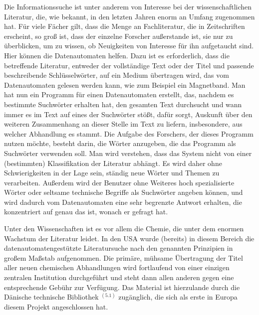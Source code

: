 {Die Informationssuche ist unter anderem von Interesse bei der wissenschaftlichen Literatur, die, wie bekannt, in den letzten Jahren enorm an Umfang zugenommen hat. Für viele Fächer gilt, dass die Menge an Fachliteratur, die in Zeitschriften erscheint, so groß ist, dass der einzelne Forscher außerstande ist, sie nur zu überblicken, um zu wissen, ob Neuigkeiten von Interesse für ihn aufgetaucht sind. Hier können die Datenautomaten helfen. Dazu ist es erforderlich, dass die betreffende Literatur, entweder der vollständige Text oder der Titel und passende beschreibende Schlüsselwörter, auf ein Medium übertragen wird, das vom Datenautomaten gelesen werden kann, wie zum Beispiel ein Magnetband. Man hat nun ein Programm für einen Datenautomaten erstellt, das, nachdem es bestimmte Suchwörter erhalten hat, den gesamten Text durchsucht und wann immer es im Text auf eines der Suchwörter stößt, dafür sorgt, Auskunft über den weiteren Zusammenhang an dieser Stelle im Text zu liefern, insbesondere, aus welcher Abhandlung es stammt. Die Aufgabe des Forschers, der dieses Programm nutzen möchte, besteht darin, die Wörter anzugeben, die das Programm als Suchwörter verwenden soll. Man wird verstehen, dass das System nicht von einer (bestimmten) Klassifikation der Literatur abhängt. Es wird daher ohne Schwierigkeiten in der Lage sein, ständig neue Wörter und Themen zu verarbeiten. Außerdem wird der Benutzer ohne Weiteres hoch spezialisierte Wörter oder seltsame technische Begriffe als Suchwörter angeben können, und wird dadurch vom Datenautomaten eine sehr begrenzte Antwort erhalten, die konzentriert auf genau das ist, wonach er gefragt hat.

Unter den Wissenschaften ist es vor allem die Chemie, die unter dem enormen Wachstum der Literatur leidet. In den USA wurde (bereits) in diesem Bereich die datenautomatengestützte Literatursuche nach den genannten Prinzipien in großem Maßstab aufgenommen. Die primäre, mühsame Übertragung der Titel aller neuen chemischen Abhandlungen wird fortlaufend von einer einzigen zentralen Institution durchgeführt und steht dann allen anderen gegen eine entsprechende Gebühr zur Verfügung. Das Material ist hierzulande durch die Dänische technische Bibliothek $^{(5.1)}$
zugänglich, die sich als erste in Europa diesem Projekt angeschlossen hat.

}



